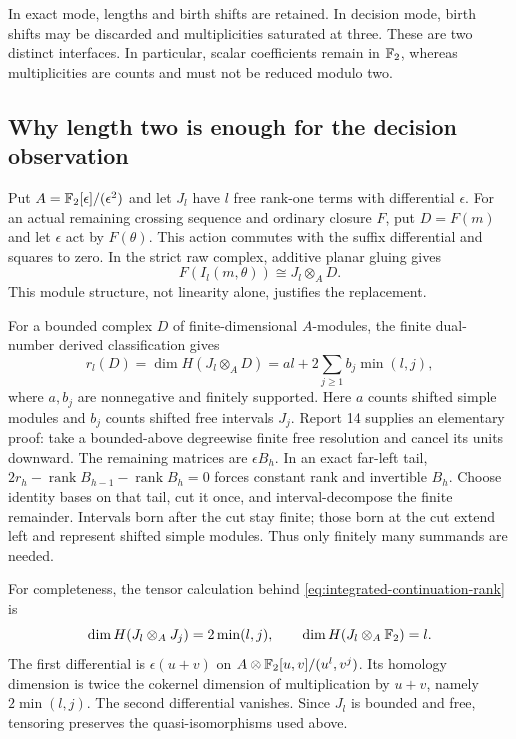 In exact mode, lengths and birth shifts are retained. In decision mode,
birth shifts may be discarded and multiplicities saturated at three.
These are two distinct interfaces. In particular, scalar coefficients
remain in $\mathbb{F}_2$, whereas multiplicities are counts and must not be reduced
modulo two.

\subsection{Why length two is enough for the decision observation}
Put $A=\mathbb{F}_2[\epsilon]/(\epsilon^2)$ and let $J_l$ have $l$ free rank-one
terms with differential $\epsilon$. For an actual remaining crossing
sequence and ordinary closure $F$, put $D=F(m)$ and let $\epsilon$ act
by $F(\theta)$. This action commutes with the suffix differential and
squares to zero. In the strict raw complex, additive planar gluing gives
\[
 F(I_l(m,\theta))\cong J_l\otimes_A D.
\]
This module structure, not linearity alone, justifies the replacement.

For a bounded complex $D$ of finite-dimensional $A$-modules, the
finite dual-number derived classification gives
\begin{equation}\label{eq:integrated-continuation-rank}
 r_l(D)=\dim H(J_l\otimes_A D)
       =a l+2\sum_{j\ge1}b_j\min(l,j),
\end{equation}
where $a,b_j$ are nonnegative and finitely supported. Here $a$ counts
shifted simple modules and $b_j$ counts shifted free intervals $J_j$.
Report 14 supplies an elementary proof: take a bounded-above degreewise
finite free resolution and cancel its units downward. The remaining
matrices are $\epsilon B_h$. In an exact far-left tail,
$2r_h-\operatorname{rank}B_{h-1}-\operatorname{rank}B_h=0$ forces
constant rank and invertible $B_h$. Choose identity bases on that tail,
cut it once, and interval-decompose the finite remainder. Intervals born
after the cut stay finite; those born at the cut extend left and represent
shifted simple modules. Thus only finitely many summands are needed.

For completeness, the tensor calculation behind
\eqref{eq:integrated-continuation-rank} is
\[
 \dim H(J_l\otimes_A J_j)=2\min(l,j),\qquad
 \dim H(J_l\otimes_A\mathbb{F}_2)=l.
\]
The first differential is $\epsilon(u+v)$ on
$A\otimes\mathbb{F}_2[u,v]/(u^l,v^j)$. Its homology dimension is twice the
cokernel dimension of multiplication by $u+v$, namely $2\min(l,j)$.
The second differential vanishes. Since $J_l$ is bounded and free,
tensoring preserves the quasi-isomorphisms used above.

